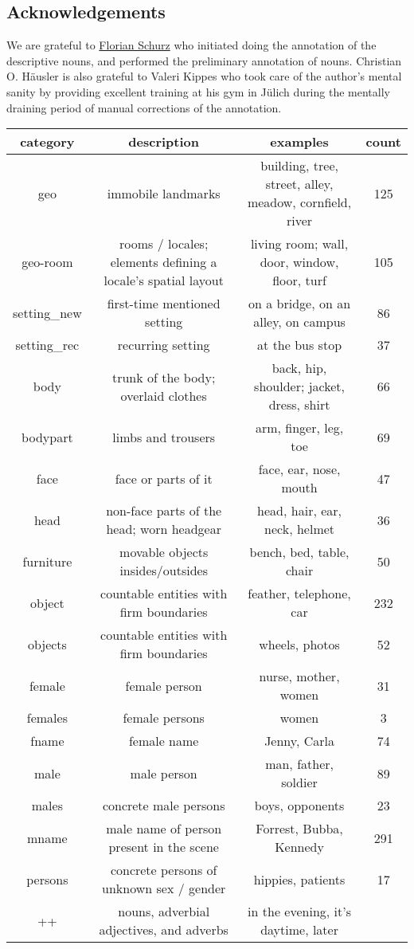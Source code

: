 \documentclass[10pt,a4paper,twocolumn]{article}
\begin{document}
\subsection*{Acknowledgements}
We are grateful to \href{www.florianschurz.de}{Florian Schurz} who initiated doing the annotation of the descriptive nouns, and performed the preliminary annotation of nouns. Christian O. Häusler is also grateful to Valeri Kippes who took care of the author's mental sanity by providing excellent training at his gym in Jülich during the mentally draining period of manual corrections of the annotation.

{\small
}

\clearpage
\begin{center}
\begin{tabular}{ |c|c|c|c| }
\hline
category & description & examples & count\\
\hline
geo & immobile landmarks & building, tree, street, alley, meadow, cornfield, river & 125\\
geo-room & rooms / locales; elements defining a locale's spatial layout & living room; wall, door, window, floor, turf & 105\\
setting\_new & first-time mentioned setting & on a bridge, on an alley, on campus & 86\\
setting\_rec & recurring setting & at the bus stop & 37\\
body & trunk of the body; overlaid clothes & back, hip, shoulder; jacket, dress, shirt & 66\\
bodypart & limbs and trousers & arm, finger, leg, toe & 69\\
face & face or parts of it & face, ear, nose, mouth & 47\\
head & non-face parts of the head; worn headgear & head, hair, ear, neck, helmet & 36\\
furniture & movable objects insides/outsides & bench, bed, table, chair & 50\\
object & countable entities with firm boundaries & feather, telephone, car & 232\\
objects & countable entities with firm boundaries & wheels, photos & 52\\
female & female person & nurse, mother, women & 31\\
females & female persons & women & 3\\
fname & female name & Jenny, Carla & 74\\
male & male person & man, father, soldier & 89\\
males & concrete male persons & boys, opponents & 23\\
mname & male name of person present in the scene & Forrest, Bubba, Kennedy & 291\\
persons & concrete persons of unknown sex / gender & hippies, patients & 17\\
++ & nouns, adverbial adjectives, and adverbs & in the evening, it's daytime, later \\
\hline
\end{tabular}
\end{center}
\end{document}
